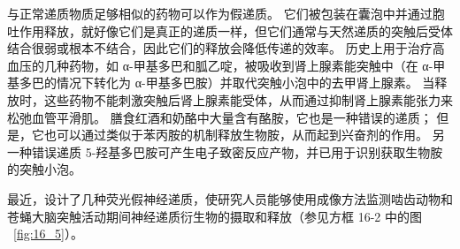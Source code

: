 与正常递质物质足够相似的药物可以作为假递质。
它们被包装在囊泡中并通过胞吐作用释放，就好像它们是真正的递质一样，但它们通常与天然递质的突触后受体结合很弱或根本不结合，因此它们的释放会降低传递的效率。
历史上用于治疗高血压的几种药物，如 α-甲基多巴和胍乙啶，被吸收到肾上腺素能突触中（在 α-甲基多巴的情况下转化为 α-甲基多巴胺）并取代突触小泡中的去甲肾上腺素。
当释放时，这些药物不能刺激突触后肾上腺素能受体，从而通过抑制肾上腺素能张力来松弛血管平滑肌。
膳食红酒和奶酪中大量含有酪胺，它也是一种错误的递质；
但是，它也可以通过类似于苯丙胺的机制释放生物胺，从而起到兴奋剂的作用。
另一种错误递质 5-羟基多巴胺可产生电子致密反应产物，并已用于识别获取生物胺的突触小泡。


最近，设计了几种荧光假神经递质，使研究人员能够使用成像方法监测啮齿动物和苍蝇大脑突触活动期间神经递质衍生物的摄取和释放（参见方框 16-2 中的图 ~\ref{fig:16_5}）。


